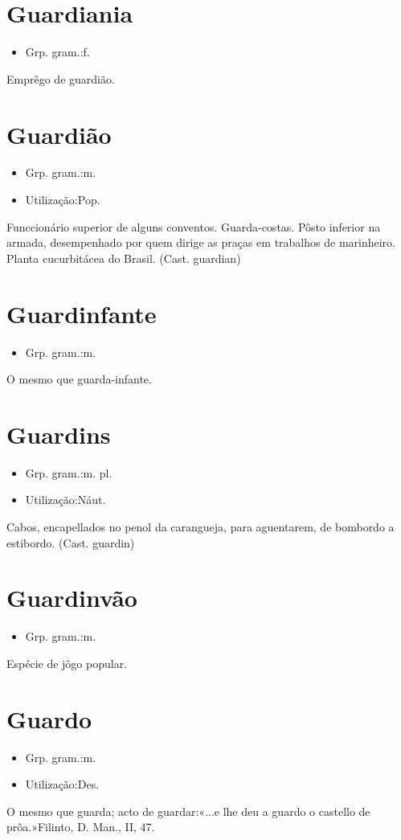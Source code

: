 \section{Guardiania}
\begin{itemize}
\item {Grp. gram.:f.}
\end{itemize}
Emprêgo de guardião.
\section{Guardião}
\begin{itemize}
\item {Grp. gram.:m.}
\end{itemize}
\begin{itemize}
\item {Utilização:Pop.}
\end{itemize}
Funccionário superior de alguns conventos.
Guarda-costas.
Pôsto inferior na armada, desempenhado por quem dirige as praças em trabalhos de marinheiro.
Planta cucurbitácea do Brasil.
(Cast. \textunderscore guardian\textunderscore )
\section{Guardinfante}
\begin{itemize}
\item {Grp. gram.:m.}
\end{itemize}
O mesmo que \textunderscore guarda-infante\textunderscore .
\section{Guardins}
\begin{itemize}
\item {Grp. gram.:m. pl.}
\end{itemize}
\begin{itemize}
\item {Utilização:Náut.}
\end{itemize}
Cabos, encapellados no penol da carangueja, para aguentarem, de bombordo a estibordo.
(Cast. \textunderscore guardin\textunderscore )
\section{Guardinvão}
\begin{itemize}
\item {Grp. gram.:m.}
\end{itemize}
Espécie de jôgo popular.
\section{Guardo}
\begin{itemize}
\item {Grp. gram.:m.}
\end{itemize}
\begin{itemize}
\item {Utilização:Des.}
\end{itemize}
O mesmo que \textunderscore guarda\textunderscore ; acto de guardar:«\textunderscore ...e lhe deu a guardo o castello de prôa.\textunderscore »Filinto, \textunderscore D. Man.\textunderscore , II, 47.
